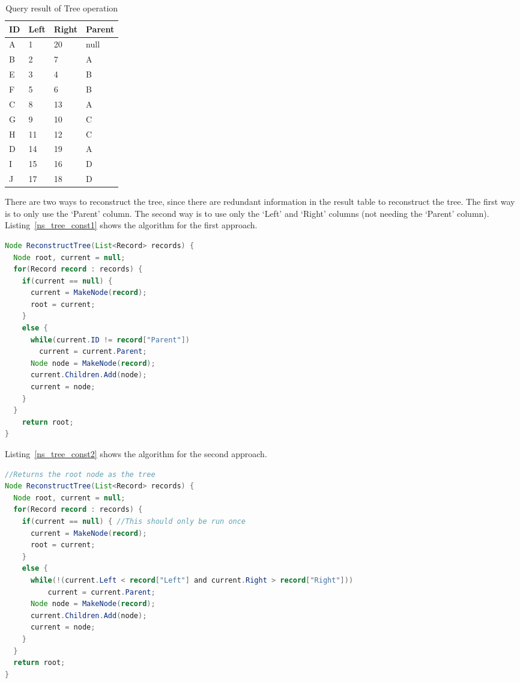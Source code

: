 \begin{table}[!h]
\centering
\caption{Query result of Tree operation\label{table:ns_tree}}
\begin{tabular}{|l|l|l|l|}
\hline
{\bf ID} & {\bf Left} & {\bf Right} & {\bf Parent} \\ \hline\hline
A & 1 & 20 & null \\ \hline
B & 2 & 7 & A \\ \hline
E & 3 & 4 & B \\ \hline
F & 5 & 6 & B \\ \hline
C & 8 & 13 & A \\ \hline
G & 9 & 10 & C \\ \hline
H & 11 & 12	& C \\ \hline
D & 14 & 19	& A \\ \hline
I & 15 & 16	& D \\ \hline
J & 17 & 18	& D \\ \hline
\end{tabular}
\end{table}

There are two ways to reconstruct the tree, since there are redundant information in the result table to reconstruct the tree. The first way is to only use the `Parent' column. The second way is to use only the `Left' and `Right' columns (not needing the `Parent' column). Listing~\ref{ns_tree_const1} shows the algorithm for the first approach.

\begin{lstlisting}[language=java,caption={Tree reconstruction using Parent},label=ns_tree_const1, float]
Node ReconstructTree(List<Record> records) {
  Node root, current = null;
  for(Record record : records) {
    if(current == null) {
      current = MakeNode(record);
      root = current;
    }
    else {
      while(current.ID != record["Parent"])
        current = current.Parent;
      Node node = MakeNode(record);
      current.Children.Add(node);
      current = node;
    }
  }
	return root;
}
\end{lstlisting}

Listing~\ref{ns_tree_const2} shows the algorithm for the second approach.

\begin{lstlisting}[language=java,caption={Tree reconstruction using Left and Right value},label=ns_tree_const2, float]
//Returns the root node as the tree
Node ReconstructTree(List<Record> records) {
  Node root, current = null;
  for(Record record : records) {
    if(current == null) { //This should only be run once
      current = MakeNode(record);
      root = current;
    }        
    else {
      while(!(current.Left < record["Left"] and current.Right > record["Right"]))
          current = current.Parent;          
      Node node = MakeNode(record);
      current.Children.Add(node);
      current = node;
    }
  }
  return root;
}
\end{lstlisting}	


